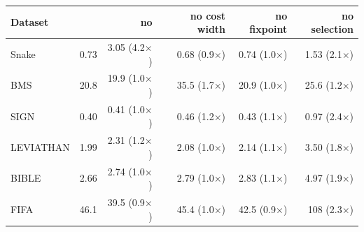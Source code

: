 \begin{tabular}{@{}lrrrrr@{}}
\toprule
Dataset & \FX{} & no \mdb{} & no cost width & no fixpoint & no selection \\
\midrule
Snake & 0.73 & 3.05 (4.2$\times$) & 0.68 (0.9$\times$) & 0.74 (1.0$\times$) & 1.53 (2.1$\times$) \\
BMS & 20.8 & 19.9 (1.0$\times$) & 35.5 (1.7$\times$) & 20.9 (1.0$\times$) & 25.6 (1.2$\times$) \\
SIGN & 0.40 & 0.41 (1.0$\times$) & 0.46 (1.2$\times$) & 0.43 (1.1$\times$) & 0.97 (2.4$\times$) \\
LEVIATHAN & 1.99 & 2.31 (1.2$\times$) & 2.08 (1.0$\times$) & 2.14 (1.1$\times$) & 3.50 (1.8$\times$) \\
BIBLE & 2.66 & 2.74 (1.0$\times$) & 2.79 (1.0$\times$) & 2.83 (1.1$\times$) & 4.97 (1.9$\times$) \\
FIFA & 46.1 & 39.5 (0.9$\times$) & 45.4 (1.0$\times$) & 42.5 (0.9$\times$) & 108 (2.3$\times$) \\
\bottomrule
\end{tabular}

